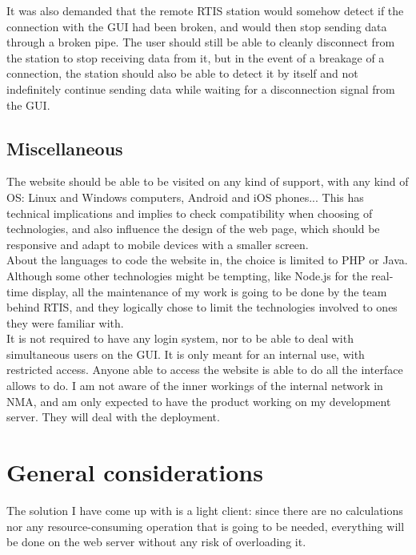 \documentclass{themeensg}
\begin{document}
It was also demanded that the remote RTIS station would somehow detect if the connection with the GUI had been broken, and would then stop sending data through a broken pipe. The user should still be able to cleanly disconnect from the station to stop receiving data from it, but in the event of a breakage of a connection, the station should also be able to detect it by itself and not indefinitely continue sending data while waiting for a disconnection signal from the GUI.

\subsection{Miscellaneous}
The website should be able to be visited on any kind of support, with any kind of OS: Linux and Windows computers, Android and iOS phones... This has technical implications and implies to check compatibility when choosing of technologies, and also influence the design of the web page, which should be responsive and adapt to mobile devices with a smaller screen.\\

About the languages to code the website in, the choice is limited to PHP or Java. Although some other  technologies might be tempting, like Node.js for the real-time display, all the maintenance of my work is going to be done by the team behind RTIS, and they logically chose to limit the technologies involved to ones they were familiar with.\\

It is not required to have any login system, nor to be able to deal with simultaneous users on the GUI. It is only meant for an internal use, with restricted access. Anyone able to access the website is able to do all the interface allows to do. I am not aware of the inner workings of the internal network in NMA, and am only expected to have the product working on my development server. They will deal with the deployment.

\section{General considerations}

The solution I have come up with is a light client: since there are no calculations nor any resource-consuming operation that is going to be needed, everything will be done on the web server without any risk of overloading it.\\
\end{document}
